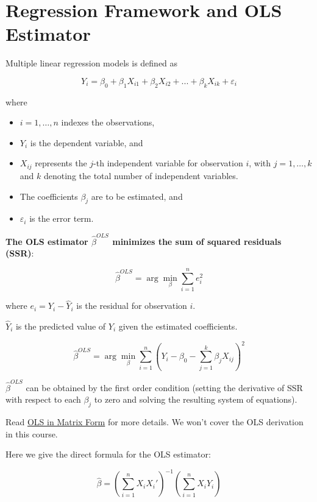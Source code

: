 \documentclass[
  12pt,
]{scrbook}
\providecommand{\tightlist}{%
  \setlength{\itemsep}{0pt}\setlength{\parskip}{0pt}}
\renewcommand{\tightlist}{\setlength{\itemsep}{0.5\baselineskip}\setlength{\parskip}{0.2\baselineskip}}
\theoremstyle{plain}
\theoremstyle{definition}
\theoremstyle{remark}
\begin{document}
\section{Regression Framework and OLS
Estimator}\label{regression-framework-and-ols-estimator}

Multiple linear regression models is defined as

\[
Y_i = \beta_0 + \beta_1 X_{i1} + \beta_2 X_{i2} + ... + \beta_k X_{ik} + \varepsilon_i
\]

where

\begin{itemize}
\tightlist
\item
  \(i=1,\ldots, n\) indexes the observations,
\item
  \(Y_i\) is the dependent variable, and
\item
  \(X_{ij}\) represents the \(j\)-th independent variable for
  observation \(i\), with \(j = 1, \ldots, k\) and \(k\) denoting the
  total number of independent variables.
\item
  The coefficients \(\beta_j\) are to be estimated, and
\item
  \(\varepsilon_i\) is the error term.
\end{itemize}

\textbf{The OLS estimator \(\hat{\beta}^{OLS}\) minimizes the sum of
squared residuals (SSR)}:

\[
\hat{\beta}^{OLS} = \arg\min_{\beta} \sum_{i=1}^{n} e_i^2 
\]

where \(e_i = Y_i - \hat{Y}_i\) is the residual for observation \(i\).

\(\hat{Y}_i\) is the predicted value of \(Y_i\) given the estimated
coefficients.

\[
\hat{\beta}^{OLS} = \arg\min_{\beta} \sum_{i=1}^{n} (Y_i - \beta_0 - \sum_{j=1}^{k} \beta_j X_{ij})^2
\]

\(\hat{\beta}^{OLS}\) can be obtained by the first order condition
(setting the derivative of SSR with respect to each \(\beta_j\) to zero
and solving the resulting system of equations).

Read
\href{https://github.com/my1396/FIN5005-Fall2024/blob/a4ec0c87c6bcbd463b4da1ad78878b1fe329cda4/images/matrix_OLS_NYU_notes.pdf}{OLS
in Matrix Form} for more details. We won't cover the OLS derivation in
this course.

Here we give the direct formula for the OLS estimator:

\[
\hat\beta = \left(\sum_{i=1}^n X_iX_i'\right)^{-1} \left(\sum_{i=1}^n X_iY_i\right)
\]
\end{document}
